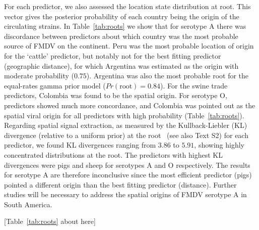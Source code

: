 \documentclass[10pt]{article}
\begin{document}
For each predictor, we also assessed the location state distribution at root. 
This vector gives the posterior probability of each country being the origin of the circulating strains.
In Table~\ref{tab:roots} we show that for serotype A there was discordance between predictors about which country was the most probable source of FMDV on the continent.
Peru was the most probable location of origin for the `cattle' predictor, but notably not for the best fitting predictor (geographic distance), for which Argentina was estimated as the origin with moderate probability ($0.75$).
Argentina was also the most probable root for the equal-rates gamma prior model ($Pr(\text{root})=0.84$).
For the swine trade predictors, Colombia was found to be the spatial origin.
For serotype O, predictors showed much more concordance, and Colombia was pointed out as the spatial viral origin for all predictors with high probability (Table~\ref{tab:roots}).
Regarding spatial signal extraction, as measured by the Kullback-Liebler (KL) divergence (relative  to a uniform prior) at the root~\cite{roots} (see also Text S2) for each predictor, we found KL divergences ranging from $3.86$ to $5.91$, showing highly concentrated distributions at the root. 
The predictors with highest KL divergences  were pigs and sheep for serotypes A and O respectively.
The results for serotype A are therefore inconclusive since the most efficient predictor (pigs) pointed a different origin than the best fitting predictor (distance).
Further studies will be necessary to address the spatial origins of FMDV serotype A in South America.

\begin{center}
 [Table~\ref{tab:roots} about here]
\end{center}
\end{document}
